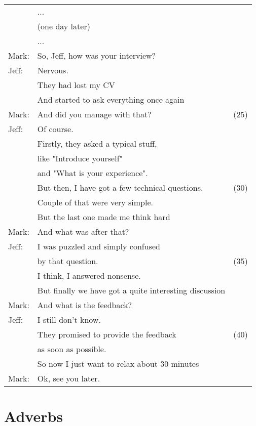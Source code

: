 \documentclass{tstextbook}
\begin{document}
\begin{definition}
\begin{tabular}{lll}
			& ... &\\
			& (one day later) &\\
			& ... &\\
			Mark: & So, Jeff, how was your interview? &\\
			Jeff: & Nervous. &\\
			& They had lost my CV &\\
			& And started to ask everything once again &\\
			Mark: & And did you manage with that? & (25)\\
			Jeff: & Of course. &\\
			& Firstly, they asked a typical stuff, &\\
			& like "Introduce yourself"& \\
			& and "What is your experience". &\\
			& But then, I have got a few technical questions. & (30)\\
			& Couple of that were very simple. &\\
			& But the last one made me think hard &\\
			Mark: & And what was after that? &\\
			Jeff: & I was puzzled and simply confused &\\
			& by that question. & (35)\\
			& I think, I answered nonsense. &\\
			& But finally we have got a quite interesting discussion &\\
			Mark: & And what is the feedback? &\\
			Jeff: & I still don't know. &\\
			& They promised to provide the feedback & (40)\\
			& as soon as possible. &\\
			& So now I just want to relax about 30 minutes &\\
			Mark: & Ok, see you later. &\\
		\end{tabular}
	\end{definition}

\section{Adverbs}
\end{document}
